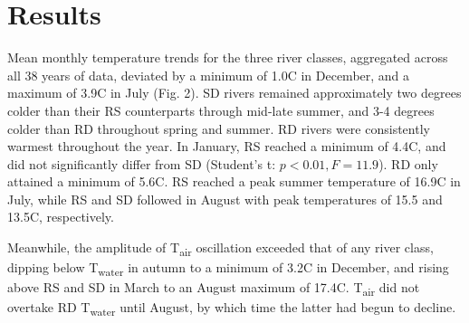 \documentclass[notitlepage]{article}
\begin{document}
\section*{Results} %

Mean monthly temperature trends for the three river classes, aggregated across all 38 years of data, deviated by a minimum of 1.0\degree C in December, and a maximum of 3.9\degree C in July (Fig. 2). SD rivers remained approximately two degrees colder than their RS counterparts through mid-late summer, and 3-4 degrees colder than RD throughout spring and summer. RD rivers were consistently warmest throughout the year. In January, RS reached a minimum of 4.4\degree C, and did not significantly differ from SD (Student's t: $p<0.01, F=11.9$). RD only attained a minimum of 5.6\degree C. RS reached a peak summer temperature of 16.9\degree C in July, while RS and SD followed in August with peak temperatures of 15.5 and 13.5\degree C, respectively.

Meanwhile, the amplitude of T\textsubscript{air} oscillation exceeded that of any river class, dipping below T\textsubscript{water} in autumn to a minimum of 3.2\degree C in December, and rising above RS and SD in March to an August maximum of 17.4\degree C. T\textsubscript{air} did not overtake RD T\textsubscript{water} until August, by which time the latter had begun to decline.

\begin{center}
\end{center}
\end{document}

